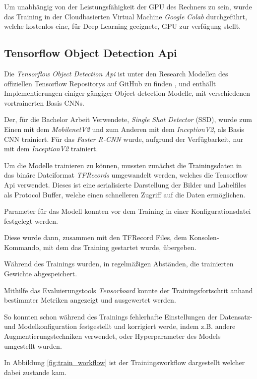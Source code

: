 Um unabhängig von der Leistungsfähigkeit der GPU des 
Rechners zu sein, wurde das Training in der Cloudbasierten
Virtual Machine \textit{Google Colab} \cite{colab} durchgeführt,
welche kostenlos eine, für Deep Learning geeignete, GPU
zur verfügung stellt.



\subsection{Tensorflow Object Detection Api}

Die \textit{Tensorflow Object Detection Api} ist unter den
Research Modellen des offiziellen Tensorflow
Repositorys auf GitHub zu finden \cite{tfobjdet},
und enthällt Implementierungen
einiger gängiger Object detection Modelle, mit verschiedenen 
vortrainerten Basis CNNs.

Der, für die Bachelor Arbeit Verwendete, \textit{Single 
Shot Detector} (SSD), wurde zum Einen mit dem 
\textit{MobilenetV2} und zum Anderen mit dem 
\textit{InceptionV2}, als Basis CNN trainiert.
Für das \textit{Faster R-CNN} wurde, aufgrund 
der Verfügbarkeit, nur mit dem \textit{InceptionV2}
trainiert.

Um die Modelle trainieren zu können, mussten zunächst die 
Trainingsdaten in das binäre Dateiformat \textit{TFRecords} 
umgewandelt werden, welches die Tensorflow Api verwendet.
Dieses ist eine serialisierte 
Darstellung der Bilder und Labelfiles als Protocol Buffer,
welche einen schnelleren Zugriff auf die Daten ermöglichen.

Parameter für das Modell konnten vor dem Training 
in einer Konfigurationsdatei festgelegt werden.

Diese wurde dann, zusammen mit den TFRecord Files, 
dem Konsolen-Kommando, mit dem das Training 
gestartet wurde, übergeben.

Während des Trainings wurden, in regelmäßigen 
Abständen, die trainierten Gewichte abgespeichert.

Mithilfe das Evaluierungstools \textit{Tensorboard}
konnte der Trainingsfortschrit anhand bestimmter
Metriken angezeigt und ausgewertet werden.

So konnten schon während des Trainings fehlerhafte
Einstellungen der Datensatz- und 
Modelkonfiguration festgestellt 
und korrigiert werde, indem z.B. andere
Augmentierungstechniken verwendet,
oder Hyperparameter des Models umgestellt wurden.

In Abbildung \ref{fig:train_workflow}
ist der Trainingsworkflow dargestellt 
welcher dabei zustande kam.

